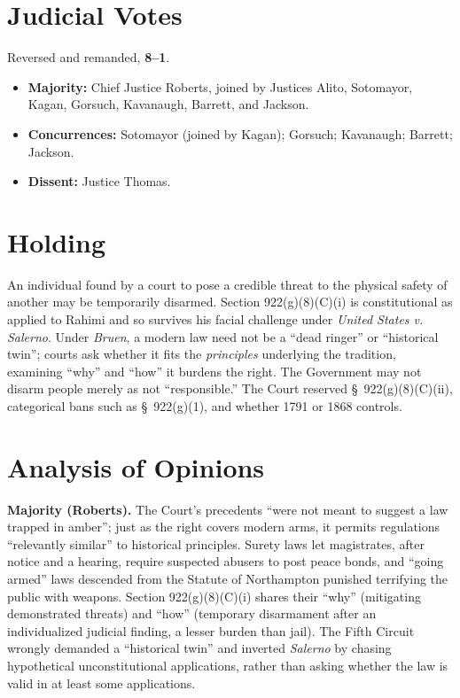 \documentclass[12pt]{article}
\begin{document}
\section{Judicial Votes}

Reversed and remanded, \textbf{8--1}.
\begin{itemize}
\item \textbf{Majority:} Chief Justice Roberts, joined by Justices Alito, Sotomayor, Kagan, Gorsuch, Kavanaugh, Barrett, and Jackson.
\item \textbf{Concurrences:} Sotomayor (joined by Kagan); Gorsuch; Kavanaugh; Barrett; Jackson.
\item \textbf{Dissent:} Justice Thomas.
\end{itemize}

\section{Holding}

An individual found by a court to pose a credible threat to the physical safety of another may be temporarily disarmed. Section 922(g)(8)(C)(i) is constitutional as applied to Rahimi and so survives his facial challenge under \textit{United States v. Salerno}. Under \textit{Bruen}, a modern law need not be a ``dead ringer'' or ``historical twin''; courts ask whether it fits the \textit{principles} underlying the tradition, examining ``why'' and ``how'' it burdens the right. The Government may not disarm people merely as not ``responsible.'' The Court reserved \S\ 922(g)(8)(C)(ii), categorical bans such as \S\ 922(g)(1), and whether 1791 or 1868 controls.

\section{Analysis of Opinions}

\textbf{Majority (Roberts).} The Court's precedents ``were not meant to suggest a law trapped in amber''; just as the right covers modern arms, it permits regulations ``relevantly similar'' to historical principles. Surety laws let magistrates, after notice and a hearing, require suspected abusers to post peace bonds, and ``going armed'' laws descended from the Statute of Northampton punished terrifying the public with weapons. Section 922(g)(8)(C)(i) shares their ``why'' (mitigating demonstrated threats) and ``how'' (temporary disarmament after an individualized judicial finding, a lesser burden than jail). The Fifth Circuit wrongly demanded a ``historical twin'' and inverted \textit{Salerno} by chasing hypothetical unconstitutional applications, rather than asking whether the law is valid in at least some applications.
\end{document}

